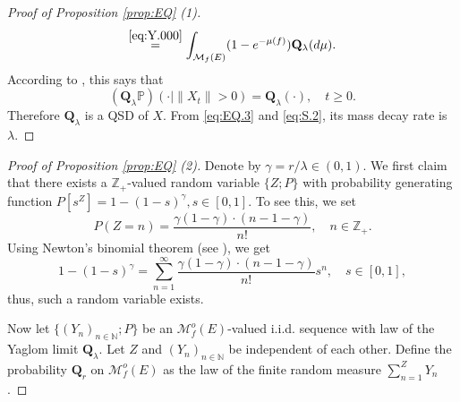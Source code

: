 \documentclass[12pt,a4paper]{amsart}
\numberwithin{equation}{section}
\theoremstyle{plain}
\theoremstyle{definition}
\theoremstyle{remark}
\begin{document}
\begin{proof}[Proof of Proposition \ref{prop:EQ} (1)]
\begin{align}
	\overset{\eqref{eq:Y.000}} =\int_{\mathcal M_f(E)} (1 - e^{-\mu(f)}) \mathbf Q_\lambda (d\mu).
	\end{align}
	According to \cite[Theorem 1.17]{Li2011MeasureValued}, this says that
	\[
	(\mathbf Q_\lambda \mathbb P)(\cdot |\|X_t\| > 0) = \mathbf Q_{\lambda}(\cdot), 
	\quad t \geq 0.
	\]
	Therefore $\mathbf Q_\lambda$ is a QSD of $X$.
	From \eqref{eq:EQ.3} and \eqref{eq:S.2}, its mass decay rate is $\lambda$.
\end{proof}

\begin{proof}[Proof of Proposition \ref{prop:EQ} (2)]
	Denote by $\gamma = r / \lambda \in (0,1)$.
	We first claim that there exists a 
	$\mathbb Z_+$-valued
	random variable $\{Z;P\}$ with probability generating function $P[s^Z] = 1 - (1- s)^{\gamma}, s\in [0,1]$. To see this, we set
	\[
	P(Z = n) = \frac{\gamma(1-\gamma ) \cdot (n-1-\gamma  )}{n!}, 
	\quad n \in \mathbb Z_+.
	\]
	Using Newton's binomial theorem (see \cite[Exercise 8.22]{Rudin1976Principles}), we get
	\[
	1 - (1 - s)^\gamma = \sum_{n = 1}^\infty \frac{\gamma (1-\gamma)\cdot (n-1-\gamma )}{n!} s^n, \quad s\in [0,1],
	\]
thus, such a random variable exists.
	
	Now let $\{(Y_n)_{n \in \mathbb N}; P\}$ 
	be an $\mathcal M^o_f(E)$-valued i.i.d. sequence 
	with law of the Yaglom limit $\mathbf Q_\lambda$.
	Let $Z$ and $(Y_n)_{n\in \mathbb N}$ be independent of each other.
	Define the probability $\mathbf Q_r$ on $\mathcal M^o_f(E)$ as the law of the finite random measure $\sum_{n=1}^Z Y_n$.
	

\end{proof}
\end{document}
